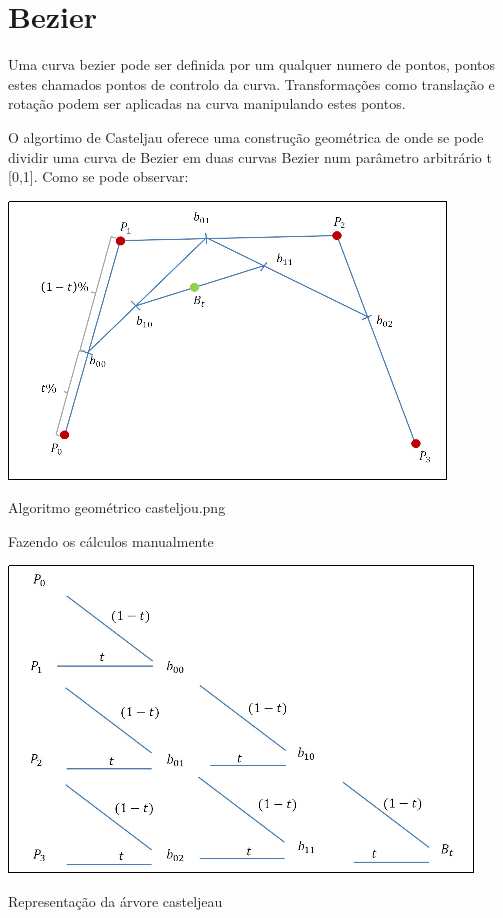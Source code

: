 \section{Bezier}

Uma curva bezier pode ser definida por um qualquer numero de pontos, pontos estes chamados pontos de controlo da curva. Transformações como translação e rotação podem ser aplicadas na curva manipulando estes pontos. 

O algortimo de Casteljau oferece uma construção geométrica de onde se pode dividir uma curva de Bezier em duas curvas Bezier num parâmetro arbitrário t [0,1]. Como se pode observar:

\begin{center}
 	
 	\includegraphics[scale=0.7,keepaspectratio]{resources/casteljou.png}
 	\captionsetup{type=figure, width=0.8\linewidth}
	\caption{Algoritmo geométrico casteljou.png}
\label{fig:ssec1:diagram:plane:to:sphere} 
\end{center}

Fazendo os cálculos manualmente 
\begin{center}
 	
 	\includegraphics[scale=0.7,keepaspectratio]{resources/casteljeau2.png}
 	\captionsetup{type=figure, width=0.8\linewidth}
	\caption{Representação da árvore casteljeau}
\label{fig:ssec1:diagram:plane:to:sphere} 
\end{center}

